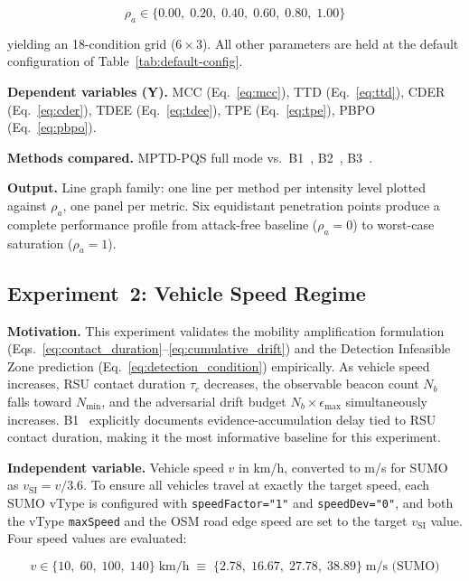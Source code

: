 \documentclass[12pt, a4paper]{report}
\begin{document}
\begin{equation}
  \rho_a \in \{0.00,\; 0.20,\; 0.40,\; 0.60,\; 0.80,\; 1.00\}
  \label{eq:exp1-x}
\end{equation}

yielding an 18-condition grid ($6 \times 3$). All other parameters
are held at the default configuration of
Table~\ref{tab:default-config}.

\textbf{Dependent variables (Y).}
MCC (Eq.~\ref{eq:mcc}),
TTD (Eq.~\ref{eq:ttd}),
CDER (Eq.~\ref{eq:cder}),
TDEE (Eq.~\ref{eq:tdee}),
TPE (Eq.~\ref{eq:tpe}),
PBPO (Eq.~\ref{eq:pbpo}).

\textbf{Methods compared.}
MPTD-PQS full mode vs.\ B1~\cite{ghaleb2014}, B2~\cite{ercan2022misbehavior}, B3~\cite{sharma2021machine}.

\textbf{Output.}
Line graph family: one line per method per intensity level plotted
against $\rho_a$, one panel per metric. Six equidistant penetration
points produce a complete performance profile from attack-free
baseline ($\rho_a = 0$) to worst-case saturation ($\rho_a = 1$).

\subsection{Experiment~2: Vehicle Speed Regime}
\label{sec:exp2}

\textbf{Motivation.}
This experiment validates the mobility amplification formulation
(Eqs.~\ref{eq:contact_duration}--\ref{eq:cumulative_drift}) and
the Detection Infeasible Zone prediction
(Eq.~\ref{eq:detection_condition}) empirically. As vehicle speed
increases, RSU contact duration $\tau_c$ decreases, the observable
beacon count $N_b$ falls toward $N_{\min}$, and the adversarial
drift budget $N_b \times \epsilon_{\max}$ simultaneously increases.
B1~\cite{ghaleb2014} explicitly documents evidence-accumulation
delay tied to RSU contact duration, making it the most informative
baseline for this experiment.

\textbf{Independent variable.}
Vehicle speed $v$ in km/h, converted to m/s for SUMO as
$v_{\mathrm{SI}} = v / 3.6$. To ensure all vehicles travel at
exactly the target speed, each SUMO vType is configured with
\texttt{speedFactor="1"} and \texttt{speedDev="0"}, and both the
vType \texttt{maxSpeed} and the OSM road edge speed are set to
the target $v_{\mathrm{SI}}$ value. Four speed values are
evaluated:

\begin{equation}
  v \in \{10,\; 60,\; 100,\; 140\}\;\text{km/h}
  \;\equiv\;
  \{2.78,\; 16.67,\; 27.78,\; 38.89\}\;\text{m/s (SUMO)}
  \label{eq:exp2-x}
\end{equation}
\end{document}
